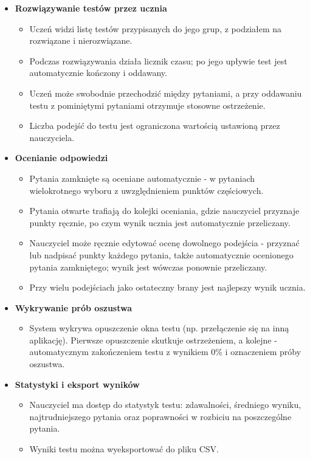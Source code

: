 \begin{itemize}
  \item \textbf{Rozwiązywanie testów przez ucznia}
  \begin{itemize}
    \item Uczeń widzi listę testów przypisanych do jego grup, z podziałem na rozwiązane
          i nierozwiązane.
    \item Podczas rozwiązywania działa licznik czasu; po jego upływie test jest automatycznie
          kończony i oddawany.
    \item Uczeń może swobodnie przechodzić między pytaniami, a przy oddawaniu testu z pominiętymi
          pytaniami otrzymuje stosowne ostrzeżenie.
    \item Liczba podejść do testu jest ograniczona wartością ustawioną przez nauczyciela.
  \end{itemize}

  \item \textbf{Ocenianie odpowiedzi}
  \begin{itemize}
    \item Pytania zamknięte są oceniane automatycznie - w pytaniach wielokrotnego wyboru
          z uwzględnieniem punktów częściowych.
    \item Pytania otwarte trafiają do kolejki oceniania, gdzie nauczyciel przyznaje punkty ręcznie,
          po czym wynik ucznia jest automatycznie przeliczany.
    \item Nauczyciel może ręcznie edytować ocenę dowolnego podejścia - przyznać lub nadpisać punkty
          każdego pytania, także automatycznie ocenionego pytania zamkniętego; wynik jest wówczas
          ponownie przeliczany.
    \item Przy wielu podejściach jako ostateczny brany jest najlepszy wynik ucznia.
  \end{itemize}

  \item \textbf{Wykrywanie prób oszustwa}
  \begin{itemize}
    \item System wykrywa opuszczenie okna testu (np. przełączenie się na inną aplikację). Pierwsze
          opuszczenie skutkuje ostrzeżeniem, a kolejne - automatycznym zakończeniem testu
          z wynikiem 0\% i oznaczeniem próby oszustwa.
  \end{itemize}

  \item \textbf{Statystyki i eksport wyników}
  \begin{itemize}
    \item Nauczyciel ma dostęp do statystyk testu: zdawalności, średniego wyniku, najtrudniejszego
          pytania oraz poprawności w rozbiciu na poszczególne pytania.
    \item Wyniki testu można wyeksportować do pliku CSV.
  \end{itemize}
\end{itemize}

